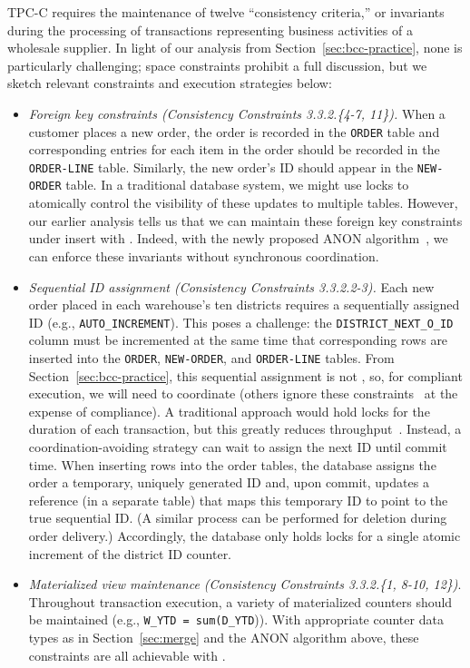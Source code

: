 TPC-C requires the maintenance of twelve ``consistency criteria,'' or
invariants during the processing of transactions representing business
activities of a wholesale supplier. In light of our analysis from
Section~\ref{sec:bcc-practice}, none is particularly challenging;
space constraints prohibit a full discussion, but we sketch relevant
constraints and execution strategies below:
\begin{itemize}

\item \textit{Foreign key constraints (Consistency Constraints
  3.3.2.\{4-7, 11\}).} When a customer places a new order, the order
  is recorded in the \texttt{ORDER} table and corresponding entries
  for each item in the order should be recorded in the
  \texttt{ORDER-LINE} table. Similarly, the new order's ID should
  appear in the \texttt{NEW-ORDER} table. In a traditional database
  system, we might use locks to atomically control the visibility of
  these updates to multiple tables. However, our earlier analysis
  tells us that we can maintain these foreign key constraints under
  insert with \cfreedom. Indeed, with the newly proposed ANON
  algorithm~\cite{ramp-txns}, we can enforce these invariants without
  synchronous coordination.

\item \textit{Sequential ID assignment (Consistency Constraints
  3.3.2.2-3).} Each new order placed in each warehouse's ten districts
  requires a sequentially assigned ID (e.g.,
  \texttt{AUTO\_INCREMENT}). This poses a challenge: the
  \texttt{DISTRICT\_NEXT\_O\_ID} column must be incremented at the
  same time that corresponding rows are inserted into the
  \texttt{ORDER}, \texttt{NEW-ORDER}, and \texttt{ORDER-LINE}
  tables. From Section~\ref{sec:bcc-practice}, this sequential
  assignment is not \cfree, so, for compliant execution, we will need
  to coordinate (others ignore these constraints~\cite{hat-vldb,silo}
  at the expense of compliance). A traditional approach would hold
  locks for the duration of each transaction, but this greatly reduces
  throughput~\cite{abadi-vll}. Instead, a coordination-avoiding
  strategy can wait to assign the next ID until commit time. When
  inserting rows into the order tables, the database assigns the order
  a temporary, uniquely generated ID and, upon commit, updates a
  reference (in a separate table) that maps this temporary ID to point
  to the true sequential ID. (A similar process can be performed for
  deletion during order delivery.) Accordingly, the database only
  holds locks for a single atomic increment of the district ID
  counter.

\item \textit{Materialized view maintenance (Consistency Constraints
  3.3.2.\{1, 8-10, 12\})}. Throughout transaction execution, a variety
  of materialized counters should be maintained (e.g., \texttt{W\_YTD
    = sum(D\_YTD})). With appropriate counter data types as in
  Section~\ref{sec:merge} and the ANON algorithm above, these
  constraints are all achievable with \cfreedom.
\end{itemize}

